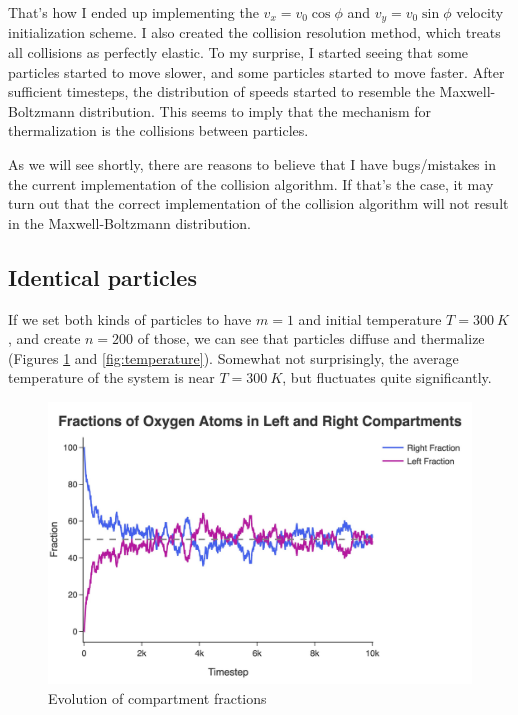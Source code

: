 \documentclass[12pt]{article}
\begin{document}
That's how I ended up implementing the $v_x=v_0 \cos\phi$ and $v_y=v_0 \sin \phi$ velocity initialization scheme. I also created the collision resolution method, which treats all collisions as perfectly elastic. To my surprise, I started seeing that some particles started to move slower, and some particles started to move faster. After sufficient timesteps, the distribution of speeds started to resemble the Maxwell-Boltzmann distribution. This seems to imply that the mechanism for thermalization is the collisions between particles.

\begin{warningbox}
    As we will see shortly, there are reasons to believe that I have bugs/mistakes in the current implementation of the collision algorithm. If that's the case, it may turn out that the correct implementation of the collision algorithm will not result in the Maxwell-Boltzmann distribution.
\end{warningbox}

\subsection{Identical particles}
If we set both kinds of particles to have $m=1$ and initial temperature
$T=\qty{300}{K}$, and create $n=200$ of those, we can see that particles diffuse and thermalize (Figures \ref{fig:compartment_fractions} and \ref{fig:temperature}). Somewhat not surprisingly, the average temperature of the system is near $T=\qty{300}{K}$, but fluctuates quite significantly.

\begin{figure}[ht]
    \centering
    \includegraphics[width=0.8\linewidth]{../figures/jpg/n200_m1_10k/compartment_fractions.jpg}
    \caption{Evolution of compartment fractions}
    \label{fig:compartment_fractions}
\end{figure}
\end{document}
